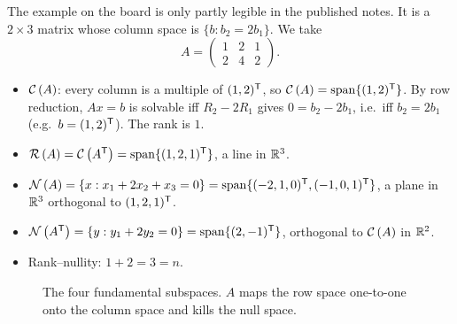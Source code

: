 \begin{example}\label{ex:L14-subspaces}
The example on the board is only partly legible in the published notes. It is a $2\times 3$ matrix whose
column space is $\{b:b_2=2b_1\}$. We take
\[
A=\begin{pmatrix}1&2&1\\2&4&2\end{pmatrix}.
\]
\begin{itemize}
  \item $\mathcal{C}\left(A\right)$: every column is a multiple of $(1,2)^{\mathsf T}$, so $\mathcal{C}\left(A\right)=\mathrm{span}\{(1,2)^{\mathsf T}\}$. By row reduction, $Ax=b$ is solvable iff
  $R_2-2R_1$ gives $0=b_2-2b_1$, i.e.\ iff $b_2=2b_1$ (e.g.\ $b=(1,2)^{\mathsf T}$). The rank is $1$.
  \item $\mathcal{R}\left(A\right)=\mathcal{C}\left(A^{\mathsf T}\right)=\mathrm{span}\{(1,2,1)^{\mathsf T}\}$, a line in $\mathbb R^3$.
  \item $\mathcal{N}\left(A\right)=\{x:x_1+2x_2+x_3=0\}=\mathrm{span}\{(-2,1,0)^{\mathsf T},(-1,0,1)^{\mathsf T}\}$, a plane in $\mathbb R^3$ orthogonal to $(1,2,1)^{\mathsf T}$.
  \item $\mathcal{N}\left(A^{\mathsf T}\right)=\{y:y_1+2y_2=0\}=\mathrm{span}\{(2,-1)^{\mathsf T}\}$, orthogonal to $\mathcal{C}\left(A\right)$ in $\mathbb R^2$.
  \item Rank--nullity: $1+2=3=n$.
\end{itemize}
\end{example}

\begin{figure}[ht]
\centering
{}
\caption{The four fundamental subspaces. $A$ maps the row space one-to-one onto the column space and kills the null space.}
\label{fig:L14-four}
\end{figure}

